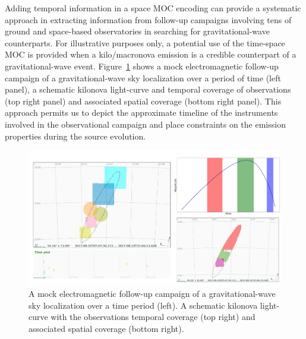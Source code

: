 \documentclass[11pt,a4paper]{ivoa}
\begin{document}
Adding temporal information in a space MOC encoding can provide a
systematic approach in extracting information from follow-up campaigns
involving tens of ground and space-based observatories in searching
for gravitational-wave counterparts.
For illustrative purposes only, a potential use of the time-space MOC
is provided when a kilo/macronova emission is a credible counterpart of a
gravitational-wave event. 
Figure~\ref{fig:gw} shows a mock electromagnetic
follow-up campaign of a gravitational-wave sky localization over a period
of time (left panel), a schematic kilonova light-curve and
temporal coverage of observations (top right panel) and associated
spatial coverage (bottom right panel). This approach permits us to depict
the approximate timeline of the instruments involved in the observational
campaign and place constraints on the emission properties during the
source evolution.

\begin{figure}[!htbp]
\begin{center}
\includegraphics[width=\textwidth]{kilo.png}
\end{center}
\caption{A mock electromagnetic follow-up campaign
  of a gravitational-wave sky localization over a time period (left).
  A schematic kilonova light-curve with the observations temporal
  coverage (top right) and associated spatial coverage (bottom right).}
\label{fig:gw} 
\end{figure} 

\end{document}
